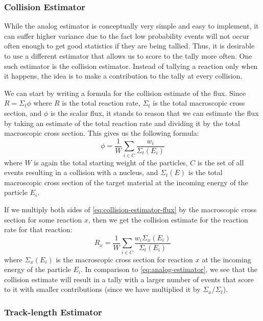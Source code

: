 \subsubsection{Collision Estimator}

While the analog estimator is conceptually very simple and easy to implement, it
can suffer higher variance due to the fact low probability events will not occur
often enough to get good statistics if they are being tallied. Thus, it is
desirable to use a different estimator that allows us to score to the tally more
often. One such estimator is the collision estimator. Instead of tallying a
reaction only when it happens, the idea is to make a contribution to the tally
at every collision.

We can start by writing a formula for the collision estimate of the flux. Since
$R = \Sigma_t \phi$ where $R$ is the total reaction rate,
$\Sigma_t$ is the total macroscopic cross section, and $\phi$ is the
scalar flux, it stands to reason that we can estimate the flux by taking an
estimate of the total reaction rate and dividing it by the total macroscopic
cross section. This gives us the following formula:
\begin{equation}
  \label{eq:collision-estimator-flux}
  \phi = \frac{1}{W} \sum_{i \in C} \frac{w_i}{\Sigma_t (E_i)}
\end{equation}
where $W$ is again the total starting weight of the particles, $C$
is the set of all events resulting in a collision with a nucleus, and
$\Sigma_t (E)$ is the total macroscopic cross section of the target
material at the incoming energy of the particle $E_i$.

If we multiply both sides of \eqref{eq:collision-estimator-flux} by the
macroscopic cross section for some reaction $x$, then we get the collision
estimate for the reaction rate for that reaction:
\begin{equation}
  \label{eq:collision-estimator}
  R_x = \frac{1}{W} \sum_{i \in C} \frac{w_i \Sigma_x (E_i)}{\Sigma_t (E_i)}
\end{equation}
where $\Sigma_x (E_i)$ is the macroscopic cross section for reaction $x$ at the
incoming energy of the particle $E_i$. In comparison to
\eqref{eq:analog-estimator}, we see that the collision estimate will result in a
tally with a larger number of events that score to it with smaller contributions
(since we have multiplied it by $\Sigma_x / \Sigma_t$).

\subsubsection{Track-length Estimator}

